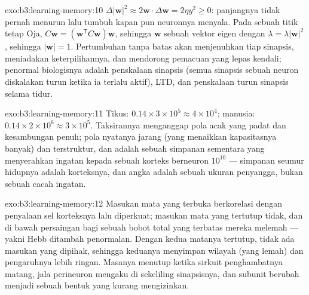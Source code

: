 \begin{solution}{exo:b3:learning-memory:10}
$\Delta|\mathbf{w}|^{2} \approx 2\mathbf{w}\cdot\Delta\mathbf{w} = 2\eta
y^{2} \ge 0$: panjangnya tidak pernah menurun lalu tumbuh kapan pun neuronnya
menyala. Pada sebuah titik tetap Oja, $C\mathbf{w} = (\mathbf{w}^{\mathsf{T}}C
\mathbf{w})\mathbf{w}$, sehingga $\mathbf{w}$ sebuah vektor eigen dengan $\lambda =
\lambda|\mathbf{w}|^{2}$, sehingga $|\mathbf{w}| = 1$. Pertumbuhan tanpa batas
akan menjenuhkan tiap sinapsis, meniadakan keterpilihannya, dan mendorong
pemacuan yang lepas kendali; penormal biologisnya adalah penskalaan sinapsis (semua
sinapsis sebuah neuron diskalakan turun ketika ia terlalu aktif), LTD, dan
penskalaan turun sinapsis selama tidur.
\end{solution}

\begin{solution}{exo:b3:learning-memory:11}
Tikus: $0.14\times 3\times 10^{5} \approx 4\times 10^{4}$; manusia: $0.14
\times 2\times 10^{6} \approx 3\times 10^{5}$. Taksirannya menganggap
pola acak yang padat dan kesambungan penuh; pola nyatanya jarang
(yang menaikkan kapasitasnya banyak) dan terstruktur, dan  adalah
sebuah simpanan sementara yang menyerahkan ingatan kepada sebuah korteks berneuron $10^{10}$
--- simpanan seumur hidupnya adalah korteksnya, dan angka  adalah sebuah
ukuran penyangga, bukan sebuah cacah ingatan.
\end{solution}

\begin{solution}{exo:b3:learning-memory:12}
Masukan mata yang terbuka berkorelasi dengan penyalaan sel korteksnya
lalu diperkuat; masukan mata yang tertutup tidak, dan di bawah
persaingan bagi sebuah bobot total yang terbatas mereka melemah --- yakni Hebb ditambah
penormalan. Dengan kedua matanya tertutup, tidak ada masukan yang dipihak, sehingga
keduanya menyimpan wilayah (yang lemah) dan pengaruhnya lebih ringan. Masanya menutup
ketika sirkuit penghambatnya matang, jala perineuron mengaku di sekeliling
sinapsisnya, dan subunit  berubah menjadi sebuah
bentuk yang kurang mengizinkan.
\end{solution}

